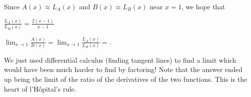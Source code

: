 \documentclass{ximera}
\begin{document}
\begin{question}
  Since $A(x) \approx L_A(x)$  and $B(x) \approx L_B(x)$ near $x=1$, we hope that 
  \begin{hint}
    $\frac{L_A(x)}{L_B(x)}  = \frac{2(x-1)}{x-1}$
\end{hint}
  $ \lim_{x \to 1} \frac{A(x)}{B(x)} =  \lim_{x \to 1} \frac{L_A(x)}{L_B(x)}=$.
\end{question}

We just used differential calculus (finding tangent lines) to find a
limit which would have been much harder to find by factoring!  Note
that the answer ended up being the limit of the ratio of the
derivatives of the two functions.  This is the heart of l'H\^opital's
rule.
\end{document}
